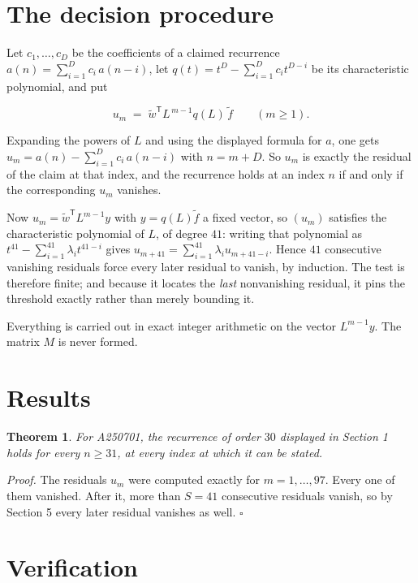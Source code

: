 \documentclass[11pt]{article}
\newtheorem{theorem}{Theorem}
\theoremstyle{definition}
\begin{document}
\section{The decision procedure}

Let $c_1,\dots,c_D$ be the coefficients of a claimed recurrence $a(n) = \sum_{i=1}^{D} c_i\,a(n-i)$, let $q(t) = t^{D} - \sum_{i=1}^{D} c_i t^{D-i}$ be its characteristic polynomial, and put

\[u_m \;=\; \tilde w^{\mathsf T} L^{\,m-1} q(L)\,\tilde f \qquad (m \ge 1).\]

Expanding the powers of $L$ and using the displayed formula for $a$, one gets $u_m = a(n) - \sum_{i=1}^{D} c_i\,a(n-i)$ with $n = m + D$. So $u_m$ is exactly the residual of the claim at that index, and the recurrence holds at an index $n$ if and only if the corresponding $u_m$ vanishes.

Now $u_m = \tilde w^{\mathsf T} L^{m-1} y$ with $y = q(L)\tilde f$ a fixed vector, so $(u_m)$ satisfies the characteristic polynomial of $L$, of degree $41$: writing that polynomial as $t^{41} - \sum_{i=1}^{41} \lambda_i t^{41-i}$ gives $u_{m+41} = \sum_{i=1}^{41} \lambda_i u_{m+41-i}$. Hence $41$ consecutive vanishing residuals force every later residual to vanish, by induction. The test is therefore finite; and because it locates the {\itshape last} nonvanishing residual, it pins the threshold exactly rather than merely bounding it.

Everything is carried out in exact integer arithmetic on the vector $L^{m-1}y$. The matrix $M$ is never formed.

\section{Results}

\begin{theorem} For A250701, the recurrence of order $30$ displayed in Section 1 holds for every $n \ge 31$, at every index at which it can be stated.\end{theorem}

{\itshape Proof.} The residuals $u_m$ were computed exactly for $m = 1,\dots,97$. Every one of them vanished. After it, more than $S = 41$ consecutive residuals vanish, so by Section 5 every later residual vanishes as well. $\square$

\section{Verification}
\end{document}
